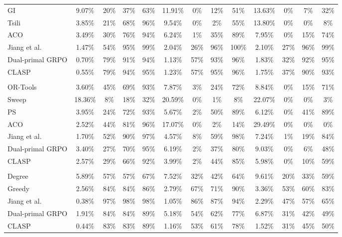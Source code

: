 \documentclass{article}
\theoremstyle{remark}
\begin{document}
\begin{table}[t]
{\begin{tabular}{lcccccccccccc}
GI & 9.07\% & 20\% & 37\% & 63\% & 11.91\% & 0\% & 12\% & 51\% & 13.63\% & 0\% & 7\% & 32\% \\
Tsili & 3.85\% & 21\% & 68\% & 96\% & 9.54\% & 0\% & 2\% & 55\% & 13.80\% & 0\% & 0\% & 8\% \\
ACO & 3.49\% & 30\% & 76\% & 94\% & 6.24\% & 1\% & 35\% & 89\% & 7.95\% & 0\% & 15\% & 74\% \\
Jiang et al. & 1.47\% & 54\% & 95\% & 99\% & 2.04\% & 26\% & 96\% & 100\% & 2.10\% & 27\% & 96\% & 99\% \\
Dual-primal GRPO & 0.70\% & 79\% & 91\% & 94\% & 1.13\% & 57\% & 93\% & 96\% & 1.83\% & 32\% & 92\% & 95\% \\
CLASP & 0.55\% & 79\% & 94\% & 95\% & 1.23\% & 57\% & 95\% & 96\% & 1.75\% & 37\% & 90\% & 93\% \\
\addlinespace[2pt]
\multicolumn{13}{l}{\textbf{CVRP}} \\
OR-Tools & 3.60\% & 45\% & 69\% & 93\% & 7.87\% & 3\% & 24\% & 72\% & 8.84\% & 0\% & 15\% & 71\% \\
Sweep & 18.36\% & 8\% & 18\% & 32\% & 20.59\% & 0\% & 1\% & 8\% & 22.07\% & 0\% & 0\% & 3\% \\
PS & 3.95\% & 24\% & 72\% & 93\% & 5.67\% & 2\% & 50\% & 89\% & 6.12\% & 0\% & 41\% & 89\% \\
ACO & 2.52\% & 44\% & 81\% & 96\% & 17.07\% & 0\% & 2\% & 14\% & 29.49\% & 0\% & 0\% & 0\% \\
Jiang et al. & 1.70\% & 52\% & 90\% & 97\% & 4.57\% & 8\% & 59\% & 98\% & 7.24\% & 1\% & 19\% & 84\% \\
Dual-primal GRPO & 3.40\% & 27\% & 70\% & 95\% & 6.19\% & 2\% & 37\% & 80\% & 9.03\% & 0\% & 6\% & 48\% \\
CLASP & 2.57\% & 29\% & 66\% & 92\% & 3.99\% & 2\% & 44\% & 85\% & 5.98\% & 0\% & 10\% & 59\% \\
\addlinespace[2pt]
\multicolumn{13}{l}{\textbf{MIS}} \\
Degree & 5.89\% & 57\% & 57\% & 67\% & 7.52\% & 32\% & 42\% & 64\% & 9.61\% & 20\% & 33\% & 59\% \\
Greedy & 2.56\% & 84\% & 84\% & 86\% & 2.79\% & 67\% & 71\% & 90\% & 3.36\% & 53\% & 60\% & 83\% \\
Jiang et al. & 0.38\% & 97\% & 98\% & 98\% & 1.05\% & 86\% & 87\% & 94\% & 2.29\% & 47\% & 57\% & 65\% \\
Dual-primal GRPO & 1.91\% & 84\% & 84\% & 89\% & 5.18\% & 54\% & 62\% & 77\% & 6.87\% & 31\% & 42\% & 49\% \\
CLASP & 0.44\% & 83\% & 83\% & 89\% & 1.16\% & 53\% & 61\% & 78\% & 1.52\% & 31\% & 45\% & 50\% \\

\end{tabular}}
\end{table}
\end{document}
